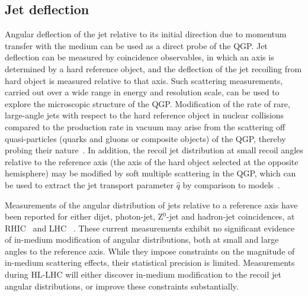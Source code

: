 \subsection{Jet deflection}

Angular deflection of the jet relative to its initial direction due to momentum transfer with the medium can be used as a direct probe of the QGP. 
Jet deflection can be measured by coincidence observables, in which an axis is determined by a hard reference object, and the deflection of the jet recoiling from hard object is measured relative to that axis. Such scattering measurements, carried out over a wide range in energy and resolution scale, can be used to explore the microscopic structure of the QGP. Modification of the rate of rare, large-angle jets with respect to the hard reference object in nuclear collisions compared to the production rate in vacuum may arise from the scattering off quasi-particles (quarks and gluons or composite objects) of the QGP, thereby probing their nature~\cite{DEramo:2012uzl}. In addition, the recoil jet distribution at small recoil angles relative to the reference axis (the axis of the hard object selected at the opposite hemisphere) may be modified by soft multiple scattering in the QGP, which can be used to extract the jet transport parameter $\hat{q}$ by comparison to models~\cite{Chen:2016vem}.

Measurements of the angular distribution of jets relative to a reference axis have been reported for either dijet, photon-jet, Z$^{0}$-jet and hadron-jet coincidences, at RHIC~\cite{Adamczyk:2017yhe} and LHC ~\cite{Adam:2015doa,Sirunyan:2017jic,Sirunyan:2017qhf,Chatrchyan:2012nia,Aaboud:2017eww}. 
These current measurements exhibit no significant evidence of in-medium modification of angular distributions, both at small and large angles to the reference axis. While they impose constraints on the magnitude of in-medium scattering effects, their statistical precision is limited. Measurements during HL-LHC will either discover in-medium modification to the recoil jet angular distributions, or improve these constraints substantially.


